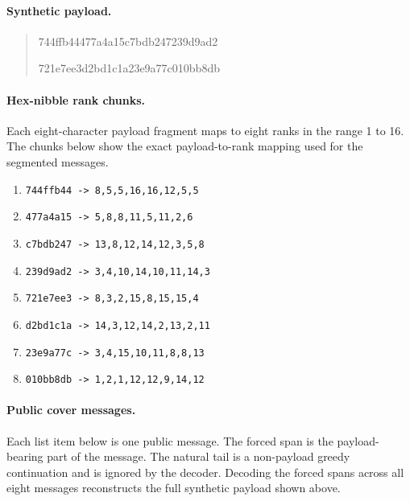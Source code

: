 \documentclass[fleqn,10pt]{wlscirep}
\begin{document}
\paragraph{Synthetic payload.}
\begin{quote}
\small\ttfamily\raggedright
744ffb44477a4a15c7bdb247239d9ad2\par
721e7ee3d2bd1c1a23e9a77c010bb8db
\end{quote}

\paragraph{Hex-nibble rank chunks.}
Each eight-character payload fragment maps to eight ranks in the range 1 to 16. The chunks below show the exact payload-to-rank mapping used for the segmented messages.

\begin{enumerate}
\item \texttt{744ffb44 -> 8,5,5,16,16,12,5,5}
\item \texttt{477a4a15 -> 5,8,8,11,5,11,2,6}
\item \texttt{c7bdb247 -> 13,8,12,14,12,3,5,8}
\item \texttt{239d9ad2 -> 3,4,10,14,10,11,14,3}
\item \texttt{721e7ee3 -> 8,3,2,15,8,15,15,4}
\item \texttt{d2bd1c1a -> 14,3,12,14,2,13,2,11}
\item \texttt{23e9a77c -> 3,4,15,10,11,8,8,13}
\item \texttt{010bb8db -> 1,2,1,12,12,9,14,12}
\end{enumerate}

\paragraph{Public cover messages.}
Each list item below is one public message. The forced span is the payload-bearing part of the message. The natural tail is a non-payload greedy continuation and is ignored by the decoder. Decoding the forced spans across all eight messages reconstructs the full synthetic payload shown above.
\end{document}
